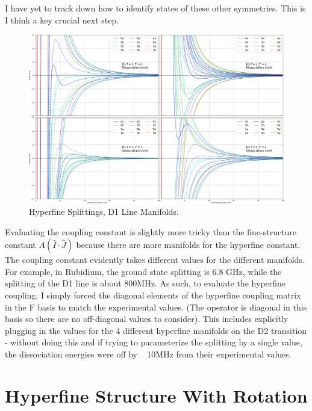 \documentclass[prl, longbibliography]{revtex4-2}
\begin{document}
I have yet to track down how to identify states of these other symmetries. This is I think a key crucial next step.

\begin{figure}
  \centering
    \includegraphics[width=\textwidth]{Hyperfine_Splitting_D1_Zoom}
    \caption{Hyperfine Splittings, D1 Line Manifolds. }
\end{figure}

Evaluating the coupling constant is slightly more tricky than the fine-structure constant $A(\hat{I}\cdot\hat{J})$ because there are more manifolds for the hyperfine constant. The coupling constant evidently takes different values for the different manifolds. For example, in Rubidium, the ground state splitting is 6.8 GHz, while the splitting of the D1 line is about 800MHz. As such, to evaluate the hyperfine coupling, I simply forced the diagonal elements of the hyperfine coupling matrix in the F basis to match the experimental values. (The operator is diagonal in this basis so there are no off-diagonal values to consider).  This includes explicitly plugging in the values for the 4 different hyperfine manifolds on the D2 transition - without doing this and if trying to parameterize the splitting by a single value, the dissociation energies were off by ~ 10MHz from their experimental values. 

\section{Hyperfine Structure With Rotation} 
\end{document}
